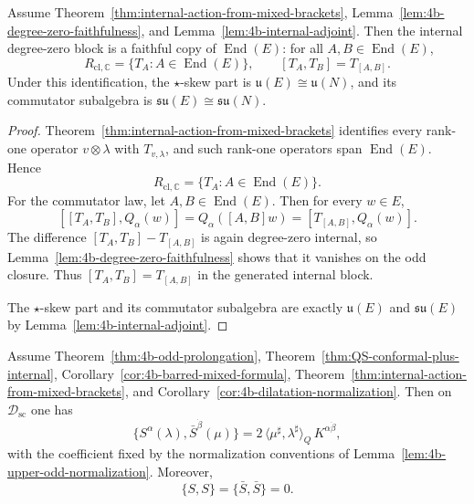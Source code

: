 \begin{theorem}
\label{thm:closure-generated-internal-saturation}
Assume Theorem~\ref{thm:internal-action-from-mixed-brackets},
Lemma~\ref{lem:4b-degree-zero-faithfulness}, and
Lemma~\ref{lem:4b-internal-adjoint}. Then the internal degree-zero block is a
faithful copy of \(\operatorname{End}(E)\): for all
\(A,B\in\operatorname{End}(E)\),
\[
  R_{\mathrm{cl},\mathbb C}
  =
  \{T_A:A\in\operatorname{End}(E)\},
  \qquad
  [T_A,T_B]=T_{[A,B]}.
\]
Under this identification, the \(\star\)-skew part is
\(\mathfrak u(E)\cong\mathfrak u(N)\), and its commutator subalgebra is
\(\mathfrak{su}(E)\cong\mathfrak{su}(N)\).
\end{theorem}

\begin{proof}
Theorem~\ref{thm:internal-action-from-mixed-brackets} identifies every rank-one
operator \(v\otimes\lambda\) with \(T_{v,\lambda}\), and such rank-one operators
span \(\operatorname{End}(E)\). Hence
\[
  R_{\mathrm{cl},\mathbb C}
  =
  \{T_A:A\in\operatorname{End}(E)\}.
\]
For the commutator law, let \(A,B\in\operatorname{End}(E)\). Then for every
\(w\in E\),
\[
  [[T_A,T_B],Q_\alpha(w)]
  =
  Q_\alpha([A,B]w)
  =
  [T_{[A,B]},Q_\alpha(w)].
\]
The difference \([T_A,T_B]-T_{[A,B]}\) is again degree-zero internal, so
Lemma~\ref{lem:4b-degree-zero-faithfulness} shows that it vanishes on the odd
closure. Thus \([T_A,T_B]=T_{[A,B]}\) in the generated internal block.

The \(\star\)-skew part and its commutator subalgebra are exactly
\(\mathfrak u(E)\) and \(\mathfrak{su}(E)\) by
Lemma~\ref{lem:4b-internal-adjoint}.
\end{proof}

\begin{theorem}
\label{thm:4b-SbarS-anticommutator}
Assume Theorem~\ref{thm:4b-odd-prolongation},
Theorem~\ref{thm:QS-conformal-plus-internal},
Corollary~\ref{cor:4b-barred-mixed-formula},
Theorem~\ref{thm:internal-action-from-mixed-brackets}, and
Corollary~\ref{cor:4b-dilatation-normalization}. Then on \(\mathcal D_{\mathrm{sc}}\) one
has
\[
\{S^\alpha(\lambda),\bar S^{\dot\beta}(\mu)\}
=
2\,\langle \mu^\sharp,\lambda^\sharp\rangle_Q\,K^{\alpha\dot\beta},
\]
with the coefficient fixed by the normalization conventions of
Lemma~\ref{lem:4b-upper-odd-normalization}. Moreover,
\[
\{S,S\}=\{\bar S,\bar S\}=0.
\]
\end{theorem}

